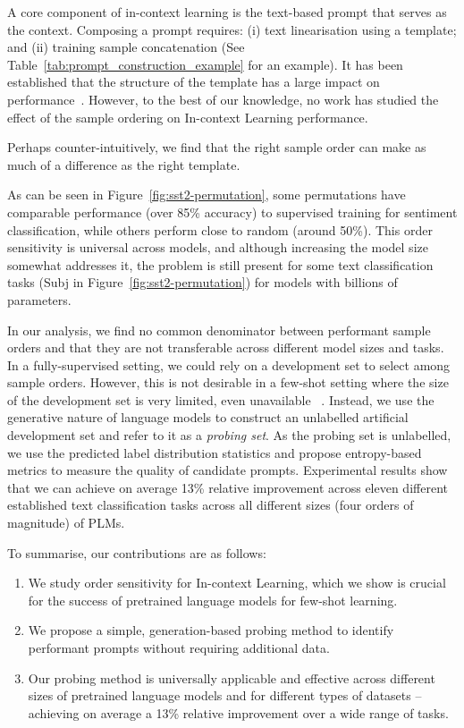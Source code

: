 A core component of in-context learning is the text-based prompt that serves as the context. Composing a prompt requires: (i) text linearisation using a template; and (ii) training sample concatenation (See Table~\ref{tab:prompt_construction_example} for an example). It has been established that the structure of the template has a large impact on performance~\cite{shin2020autoprompt,gao2020making,schick2020pet,jiang2020can}. However, to the best of our knowledge, no work has studied the effect of the sample ordering on In-context Learning performance.

Perhaps counter-intuitively, we find that the right sample order can make as much of a difference as the right template. 

As can be seen in Figure~\ref{fig:sst2-permutation}, some permutations have comparable performance (over 85\% accuracy) to supervised training for sentiment classification, while others perform close to random (around 50\%).
This order sensitivity is universal across models, and although increasing the model size somewhat addresses it, the problem is still present for some text classification tasks (Subj in Figure~\ref{fig:sst2-permutation}) for models with billions of parameters.

In our analysis, we find no common denominator between performant sample orders and that they are not transferable across different model sizes and tasks. In a fully-supervised setting, we could rely on a development set to select among sample orders. However, this is not desirable in a few-shot setting where the size of the development set is very limited, even unavailable~\cite{perez2021true} . Instead, we use the generative nature of language models to construct an unlabelled artificial development set and refer to it as a \textit{probing set}. As the probing set is unlabelled, we use the predicted label distribution statistics and propose entropy-based metrics to measure the quality of candidate prompts. Experimental results show that we can achieve on average 13\% relative improvement across eleven different established text classification tasks across all different sizes (four orders of magnitude) of PLMs.

To summarise, our contributions are as follows:

\begin{enumerate}
    \item{We study order sensitivity for In-context Learning, which we show is crucial for the success of pretrained language models for few-shot learning.}
    \item{We propose a simple, generation-based probing method to identify performant prompts without requiring additional data.}
    \item{Our probing method is universally applicable and effective across different sizes of pretrained language models and for different types of datasets -- achieving on average a 13\% relative improvement over a wide range of tasks.}
\end{enumerate}

